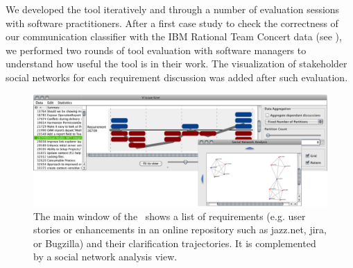 We developed the tool iteratively and through a number of evaluation sessions with software practitioners. 
After a first case study to check the correctness of our communication classifier with the IBM Rational Team Concert data (see \cite{Knauss2012f}), we performed two rounds of tool evaluation with software managers to understand how useful the tool is in their work. 
The visualization of stakeholder social networks for each requirement discussion was added after such evaluation. 


\begin{figure}
\centering
\includegraphics[width=1\textwidth]{img/vissuelizer-screenshot2}
\caption{The main window of the \viss\ shows a list of requirements (e.g. user stories or enhancements in an online repository such as jazz.net, jira, or Bugzilla) and their clarification trajectories. It is complemented by a social network analysis view.}
\label{fig:screenshot}
\end{figure}